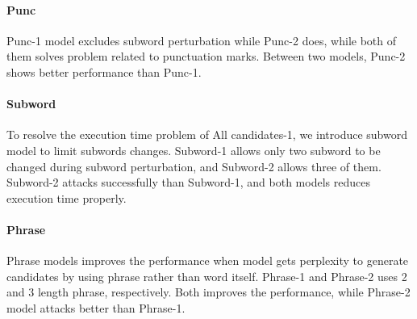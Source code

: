 \documentclass[11pt,a4paper]{article}
\begin{document}
\paragraph{Punc}
Punc-1 model excludes subword perturbation while Punc-2 does, while both of them solves problem related to punctuation marks. Between two models, Punc-2 shows better performance than Punc-1.

\paragraph{Subword}
To resolve the execution time problem of All candidates-1, we introduce subword model to limit subwords changes.
Subword-1 allows only two subword to be changed during subword perturbation, and Subword-2 allows three of them.
Subword-2 attacks successfully than Subword-1, and both models reduces execution time properly.

\paragraph{Phrase}
Phrase models improves the performance when model gets perplexity to generate candidates by using phrase rather than word itself.
Phrase-1 and Phrase-2 uses 2 and 3 length phrase, respectively. Both improves the performance, while Phrase-2 model attacks better than Phrase-1.
\end{document}
